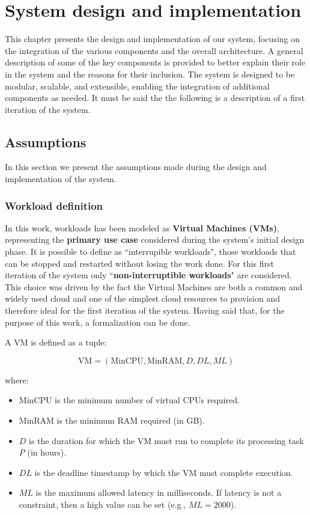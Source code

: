 \chapter{System design and implementation}
\label{cha:design}

This chapter presents the design and implementation of our system, focusing on the integration of the various components and the overall architecture. 
A general description of some of the key components is provided to better explain their role in the system and the reasons for their inclusion.
The system is designed to be modular, scalable, and extensible, enabling the integration of additional components as needed.
It must be said the the following is a description of a first iteration of the system. 

\section{Assumptions}

In this section we present the assumptions made during the design and implementation of the system. 

\subsection{Workload definition}
In this work, workloads has been modeled as \textbf{Virtual Machines (VMs)}, representing the \textbf{primary use case} considered during the system's initial design phase. 
It is possible to define as ``interrupible workloads", those workloads that can be stopped and restarted without losing the work done. 
For this first iteration of the system only ``\textbf{non-interruptible workloads}" are considered.
This choice was driven by the fact the Virtual Machines are both a common and widely used cloud and one of the simplest cloud resources to provision and therefore ideal for the first iteration of the system.
Having said that, for the purpose of this work, a formalization can be done.

A VM is defined as a tuple:

\[
\text{VM} = (\text{MinCPU}, \text{MinRAM}, D, DL, ML)
\]

where:
\begin{itemize}[itemsep=0.2pt, topsep=1pt]
    \item \( \text{MinCPU} \) is the minimum number of virtual CPUs required.
    \item \( \text{MinRAM} \) is the minimum RAM required (in GB).
    \item \( D \) is the duration for which the VM must run to complete its processing task \( P \) (in hours).
    \item \( DL \) is the deadline timestamp by which the VM must complete execution.
    \item \( ML \) is the maximum allowed latency in milliseconds. If latency is not a constraint, then a high value can be set (e.g., \( ML = 2000 \)). \\
\end{itemize}

